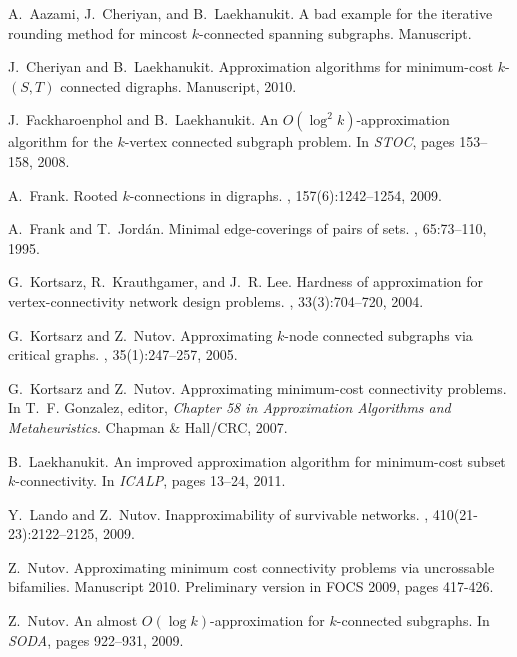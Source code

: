 \begin{thebibliography}{10}

A.~Aazami, J.~Cheriyan, and B.~Laekhanukit.
\newblock A bad example for the iterative rounding method for mincost
  $k$-connected spanning subgraphs.
\newblock Manuscript.

J.~Cheriyan and B.~Laekhanukit.
\newblock Approximation algorithms for minimum-cost $k$-{$(S,T)$} connected
  digraphs.
\newblock Manuscript, 2010.

J.~Fackharoenphol and B.~Laekhanukit.
\newblock An ${O}(\log^2 k)$-approximation algorithm for the $k$-vertex
  connected subgraph problem.
\newblock In {\em STOC}, pages 153--158, 2008.

A.~Frank.
\newblock Rooted $k$-connections in digraphs.
, 157(6):1242--1254, 2009.

A.~Frank and T.~Jord\'{a}n.
\newblock Minimal edge-coverings of pairs of sets.
, 65:73--110, 1995.

G.~Kortsarz, R.~Krauthgamer, and J.~R. Lee.
\newblock Hard\-ness of approximation for vertex-connectivity net\-work design
  problems.
, 33(3):704--720, 2004.

G.~Kortsarz and Z.~Nutov.
\newblock Approximating $k$-node connected subgraphs via critical graphs.
, 35(1):247--257, 2005.

G.~Kortsarz and Z.~Nutov.
\newblock Approximating minimum-cost connectivity problems.
\newblock In T.~F. Gonzalez, editor, {\em {\em Chapter 58 in} Approximation
  Algorithms and Metaheuristics}. Chapman \& Hall/CRC, 2007.

B.~Laekhanukit.
\newblock An improved approximation algorithm for minimum-cost subset
  $k$-connectivity.
\newblock In {\em ICALP}, pages 13--24, 2011.

Y.~Lando and Z.~Nutov.
\newblock Inapproximability of survivable networks.
, 410(21-23):2122--2125, 2009.

Z.~Nutov.
\newblock Approximating minimum cost connectivity problems via uncrossable
  bifamilies.
\newblock Manuscript 2010. Preliminary version in FOCS 2009, pages 417-426.

Z.~Nutov.
\newblock An almost {$O(\log k)$}-approximation for $k$-connected subgraphs.
\newblock In {\em SODA}, pages 922--931, 2009.


\end{thebibliography}
